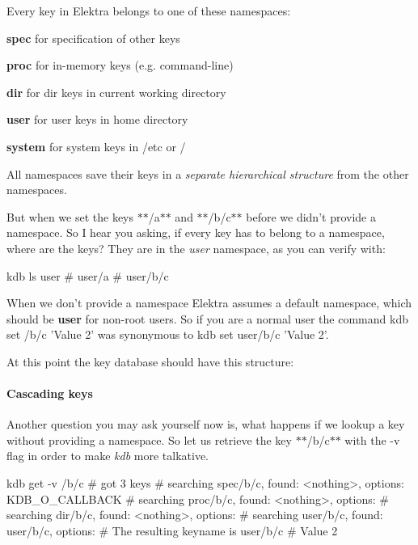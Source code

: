 Every key in Elektra belongs to one of these namespaces\+:
\begin{DoxyItemize}
\item {\bfseries spec} for specification of other keys
\item {\bfseries proc} for in-\/memory keys (e.\+g. command-\/line)
\item {\bfseries dir} for dir keys in current working directory
\item {\bfseries user} for user keys in home directory
\item {\bfseries system} for system keys in /etc or /
\end{DoxyItemize}

All namespaces save their keys in a {\itshape separate hierarchical structure} from the other namespaces.

But when we set the keys $\ast$$\ast$/a$\ast$$\ast$ and $\ast$$\ast$/b/c$\ast$$\ast$ before we didn't provide a namespace. So I hear you asking, if every key has to belong to a namespace, where are the keys? They are in the {\itshape user} namespace, as you can verify with\+: \begin{DoxyVerb}    kdb ls user
    # user/a
    # user/b/c
\end{DoxyVerb}


When we don't provide a namespace Elektra assumes a default namespace, which should be {\bfseries user} for non-\/root users. So if you are a normal user the command {\ttfamily kdb set /b/c 'Value 2'} was synonymous to {\ttfamily kdb set user/b/c 'Value 2'}.

At this point the key database should have this structure\+:  \paragraph*{Cascading keys}

Another question you may ask yourself now is, what happens if we lookup a key without providing a namespace. So let us retrieve the key $\ast$$\ast$/b/c$\ast$$\ast$ with the -\/v flag in order to make {\itshape kdb} more talkative. \begin{DoxyVerb}    kdb get -v /b/c
    # got 3 keys
    #  searching spec/b/c, found: <nothing>, options: KDB_O_CALLBACK
    #  searching proc/b/c, found: <nothing>, options:
    #  searching dir/b/c, found: <nothing>, options:
    #  searching user/b/c, found: user/b/c, options:
    # The resulting keyname is user/b/c
    # Value 2
\end{DoxyVerb}


